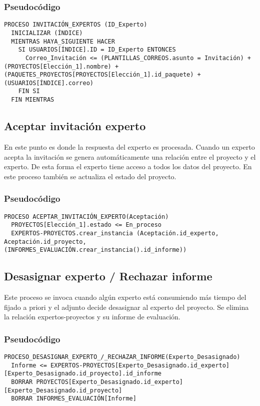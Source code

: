 \documentclass[12pt,a4paper,spanish,twoside]{book}
\begin{document}
\subsubsection{Pseudocódigo}
\begin{lstlisting}[inputencoding=utf8/latin1]
PROCESO INVITACIÓN_EXPERTOS (ID_Experto)
  INICIALIZAR (ÍNDICE)
  MIENTRAS HAYA_SIGUIENTE HACER
    SI USUARIOS[ÍNDICE].ID = ID_Experto ENTONCES
      Correo_Invitación <= (PLANTILLAS_CORREOS.asunto = Invitación) + (PROYECTOS[Elección_1].nombre) + (PAQUETES_PROYECTOS[PROYECTOS[Elección_1].id_paquete) + (USUARIOS[ÍNDICE].correo)
    FIN SI
  FIN MIENTRAS

\end{lstlisting}

\subsection{Aceptar invitación experto}
En este punto es donde la respuesta del experto es procesada. Cuando un experto 
acepta la invitación se genera automáticamente una relación entre el proyecto y 
el experto. De esta forma el experto tiene acceso a todos los datos del 
proyecto. En este proceso también se actualiza el estado del proyecto.

\subsubsection{Pseudocódigo}
\begin{lstlisting}[inputencoding=utf8/latin1]
PROCESO ACEPTAR_INVITACIÓN_EXPERTO(Aceptación)
  PROYECTOS[Elección_1].estado <= En_proceso  
  EXPERTOS-PROYECTOS.crear_instancia (Aceptación.id_experto, Aceptación.id_proyecto, (INFORMES_EVALUACIÓN.crear_instancia().id_informe))

\end{lstlisting}

\subsection{Desasignar experto / Rechazar informe}
Este proceso se invoca cuando algún experto está consumiendo más tiempo del 
fijado a priori y el adjunto decide desasignar al experto del proyecto. Se 
elimina la relación expertos-proyectos y su informe de evaluación.

\subsubsection{Pseudocódigo}
\begin{lstlisting}[inputencoding=utf8/latin1]
PROCESO_DESASIGNAR_EXPERTO_/_RECHAZAR_INFORME(Experto_Desasignado)
  Informe <= EXPERTOS-PROYECTOS[Experto_Desasignado.id_experto][Experto_Desasignado.id_proyecto].id_informe
  BORRAR PROYECTOS[Experto_Desasignado.id_experto][Experto_Desasignado.id_proyecto]  
  BORRAR INFORMES_EVALUACIÓN[Informe]

\end{lstlisting}
\end{document}
